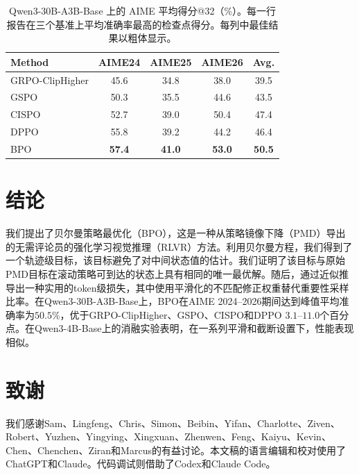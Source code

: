 \documentclass[11pt]{article}
\theoremstyle{definition}
\begin{document}
\begin{table}[htbp]
\centering
\caption{Qwen3-30B-A3B-Base 上的 AIME 平均得分@32（\%）。每一行报告在三个基准上平均准确率最高的检查点得分。每列中最佳结果以粗体显示。}
\label{tab:mainaime}
\small
\renewcommand{\arraystretch}{1.1}
\begin{tabular}{lcccc}
\hline
Method & AIME24 & AIME25 & AIME26 & Avg. \\
\hline
GRPO-ClipHigher & 45.6 & 34.8 & 38.0 & 39.5 \\
GSPO & 50.3 & 35.5 & 44.6 & 43.5 \\
CISPO & 52.7 & 39.0 & 50.4 & 47.4 \\
DPPO & 55.8 & 39.2 & 44.2 & 46.4 \\
BPO & \textbf{57.4} & \textbf{41.0} & \textbf{53.0} & \textbf{50.5} \\
\hline
\end{tabular}
\end{table}

\FloatBarrier

\section{结论}\label{sec:conclusion}
我们提出了贝尔曼策略最优化（BPO），这是一种从策略镜像下降（PMD）导出的无需评论员的强化学习视觉推理（RLVR）方法。利用贝尔曼方程，我们得到了一个轨迹级目标，该目标避免了对中间状态值的估计。我们证明了该目标与原始PMD目标在滚动策略可到达的状态上具有相同的唯一最优解。随后，通过近似推导出一种实用的token级损失，其中使用平滑化的不匹配修正权重替代重要性采样比率。在Qwen3-30B-A3B-Base上，BPO在AIME 2024--2026期间达到峰值平均准确率为$50.5\%$，优于GRPO-ClipHigher、GSPO、CISPO和DPPO $3.1$--$11.0$个百分点。在Qwen3-4B-Base上的消融实验表明，在一系列平滑和截断设置下，性能表现相似。

\section*{致谢}
我们感谢Sam、Lingfeng、Chris、Simon、Beibin、Yifan、Charlotte、Ziven、Robert、Yuzhen、Yingying、Xingxuan、Zhenwen、Feng、Kaiyu、Kevin、Chen、Chenchen、Ziran和Marcus的有益讨论。本文稿的语言编辑和校对使用了ChatGPT和Claude。代码调试则借助了Codex和Claude Code。  

\FloatBarrier


\end{document}
